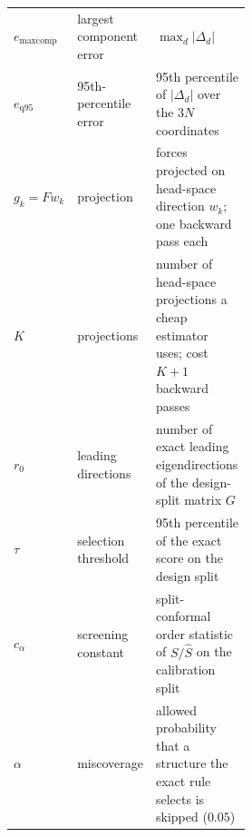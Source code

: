 \begin{table}[t]
\begin{tabular}{@{}llp{0.52\linewidth}@{}}
$e_{\mathrm{maxcomp}}$ & largest component error & $\max_d\lvert\Delta_d\rvert$ \\
$e_{\mathrm{q95}}$ & 95th-percentile error & 95th percentile of $\lvert\Delta_d\rvert$ over the $3N$ coordinates \\
$g_k=Fw_k$ & projection & forces projected on head-space direction $w_k$; one backward pass each \\
$K$ & projections & number of head-space projections a cheap estimator uses; cost $K+1$ backward passes \\
$r_0$ & leading directions & number of exact leading eigendirections of the design-split matrix $G$ \\
$\tau$ & selection threshold & 95th percentile of the exact score on the design split \\
$c_\alpha$ & screening constant & split-conformal order statistic of $S/\hat S$ on the calibration split \\
$\alpha$ & miscoverage & allowed probability that a structure the exact rule selects is skipped ($0.05$) \\
\bottomrule
\end{tabular}
\end{table}
